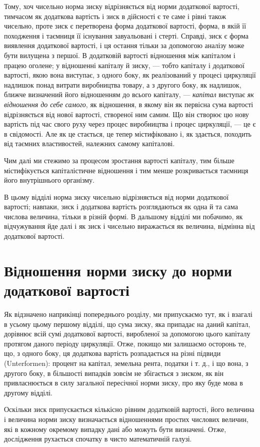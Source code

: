 Тому, хоч чисельно норма зиску відрізняється від норми додаткової
вартості, тимчасом як додаткова вартість і зиск в
дійсності є те саме і рівні також чисельно, проте зиск є перетворена
форма додаткової вартості, форма, в якій її походження
і таємниця її існування завуальовані і стерті. Справді,
зиск є форма виявлення додаткової вартості, і ця остання тільки
за допомогою аналізу може бути вилущена з першої. В додатковій
вартості відношення між капіталом і працею оголене; у
відношенні капіталу й зиску, — тобто капіталу і додаткової вартості,
якою вона виступає, з одного боку, як реалізований у
процесі циркуляції надлишок понад витрати виробництва товару,
а з другого боку, як надлишок, ближче визначений його
відношенням до всього капіталу, — \emph{капітал} виступає \emph{як відношення
до себе самого}, як відношення, в якому він як первісна
сума вартості відрізняється від нової вартості, створеної ним
самим. Що він створює цю нову вартість під час свого
руху через процес виробництва і процес циркуляції, — це є в свідомості.
Але як це стається, це тепер містифіковано і, як
здається, походить від таємних властивостей, належних самому
капіталові.

Чим далі ми стежимо за процесом зростання вартості капіталу,
тим більше містифікується капіталістичне відношення і тим
менше розкривається таємниця його внутрішнього організму.

В цьому відділі норма зиску чисельно відрізняється від
норми додаткової вартості; навпаки, зиск і додаткова вартість
розглядаються як одна й та сама числова величина, тільки
в різній формі. В дальшому відділі ми побачимо, як відчужування
йде далі і як зиск і чисельно виражається як величина,
відмінна від додаткової вартості.

\section{Відношення норми зиску до норми
додаткової вартості}

Як відзначено наприкінці попереднього розділу, ми припускаємо
тут, як і взагалі в усьому цьому першому відділі, що
сума зиску, яка припадає на даний капітал, дорівнює всій сумі
додаткової вартості, виробленої за допомогою цього капіталу
протягом даного періоду циркуляції. Отже, покищо ми залишаємо
осторонь те, що, з одного боку, ця додаткова вартість
розпадається на різні підвиди (Unterformen): процент на капітал,
земельна рента, податки і т. д., і що вона, з другого боку,
в більшості випадків зовсім не збігається з зиском, як він привласнюється
в силу загальної пересічної норми зиску, про яку
буде мова в другому відділі.

Оскільки зиск припускається кількісно рівним додатковій
вартості, його величина і величина норми зиску визначається відношеннями
простих числових величин, які в кожному окремому
випадку дані або можуть бути визначені. Отже, дослідження
рухається спочатку в чисто математичній галузі.
